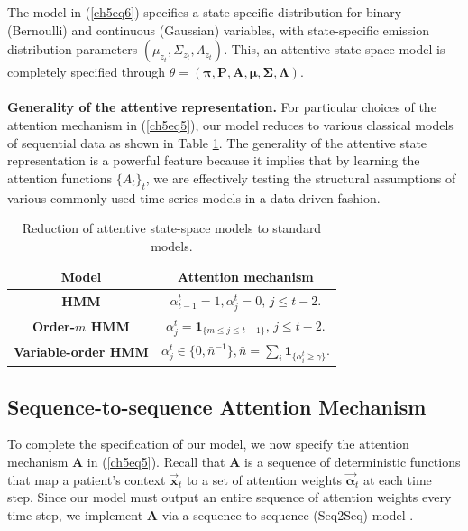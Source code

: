 \documentclass [PhD] {uclathes}
\begin{document}
The model in (\ref{ch5eq6}) specifies a state-specific distribution for binary (Bernoulli) and continuous (Gaussian) variables, with state-specific emission distribution parameters $(\mu_{z_{t}},\Sigma_{z_{t}},\Lambda_{z_{t}})$. This, an attentive state-space model is completely specified through $\theta = (\boldsymbol{\pi},\boldsymbol{P},\boldsymbol{A},\boldsymbol{\mu},\boldsymbol{\Sigma},\boldsymbol{\Lambda})$.\\
\\
{\bf Generality of the attentive representation.}\,\,For particular choices of the attention mechanism in (\ref{ch5eq5}), our model reduces to various classical models of sequential data as shown in Table \ref{ch5Table1}. The generality of the attentive state representation is a powerful feature because it implies that by learning the attention functions $\{A_t\}_t$, we are effectively testing the structural assumptions of various commonly-used time series models in a data-driven fashion. 

\begin{table}
\centering 
\begin{tabular}{cc}
    \toprule
    {\footnotesize \bf Model} & {\footnotesize \bf Attention mechanism}  \\
    \midrule
    {\footnotesize {\bf HMM} \cite{liu2015efficient}} & \mbox{\footnotesize $\alpha^t_{t-1} = 1, \alpha^t_j = 0,\, j \leq t-2$.}  \\[1ex]
    {\footnotesize {\bf Order-$m$ HMM} \cite{willems1995context}} & \mbox{\footnotesize $\alpha^t_j = \boldsymbol{1}_{\{m \leq j \leq t-1\}},\, j \leq t-2$.} \\[1ex]
    {\footnotesize {\bf Variable-order HMM} \cite{begleiter2004prediction}} & \mbox{\footnotesize $\alpha^t_j \in \{0,\bar{n}^{-1}\}, \bar{n} = \sum_i\boldsymbol{1}_{\{\alpha^t_i \geq \gamma\}}$.} \\
    \bottomrule  
  \end{tabular}
  \caption{Reduction of attentive state-space models to standard models.}
  \label{ch5Table1}
\end{table}

\subsection{Sequence-to-sequence Attention Mechanism}
\label{SSec23} 
To complete the specification of our model, we now specify the attention mechanism $\boldsymbol{A}$ in (\ref{ch5eq5}). Recall that $\boldsymbol{A}$ is a sequence of deterministic functions that map a patient's context $\boldsymbol{\vec{x}}_t$ to a set of attention weights $\boldsymbol{\vec{\alpha}}_{t}$ at each time step. Since our model must output an entire sequence of attention weights every time step, we implement $\boldsymbol{A}$ via a sequence-to-sequence (Seq2Seq) model \cite{sutskever2014sequence}. 
\end{document}
